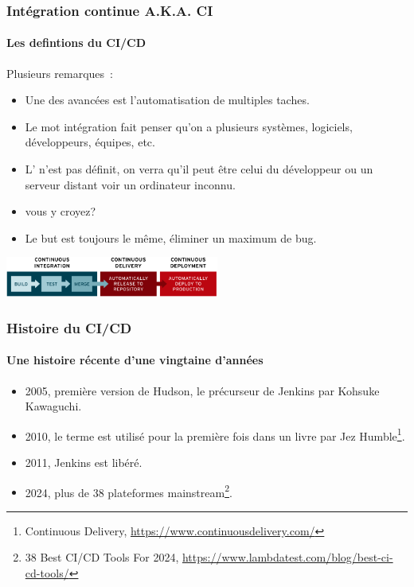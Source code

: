 \documentclass{beamer}
\begin{document}
    \begin{frame}
        \frametitle{Intégration continue A.K.A. CI}
        \framesubtitle{Les defintions du CI/CD}
        \transdissolve
        Plusieurs remarques~:
        \begin{itemize}
            \item Une des avancées est l'automatisation de multiples taches.
            \item Le mot intégration fait penser qu'on a plusieurs systèmes, logiciels, développeurs, équipes, etc.
            \item L' n'est pas définit, on verra qu'il peut être celui du développeur ou un serveur distant voir un ordinateur inconnu.
            \item {} vous y croyez?
            \item Le but est toujours le même, éliminer un maximum de bug.
        \end{itemize}
        \bigbreak
        \centering
        \includegraphics[width=7cm]{image/ci-cd-flow}
    \end{frame}

    \begin{frame}
        \frametitle{Histoire du CI/CD}
        \framesubtitle{Une histoire récente d'une vingtaine d'années}
        \transdissolve
        \begin{itemize}
            \item 2005, première version de Hudson, le précurseur de Jenkins par Kohsuke Kawaguchi.
            \item 2010, le terme  est utilisé pour la première fois dans un livre par Jez Humble\footnote{\label{ci}Continuous Delivery, \url{https://www.continuousdelivery.com/}}.
            \item 2011, Jenkins est libéré.
            \item 2024, plus de 38 plateformes mainstream\footnote{38 Best CI/CD Tools For 2024, \url{https://www.lambdatest.com/blog/best-ci-cd-tools/}}.
        \end{itemize}
    \end{frame}
\end{document}
